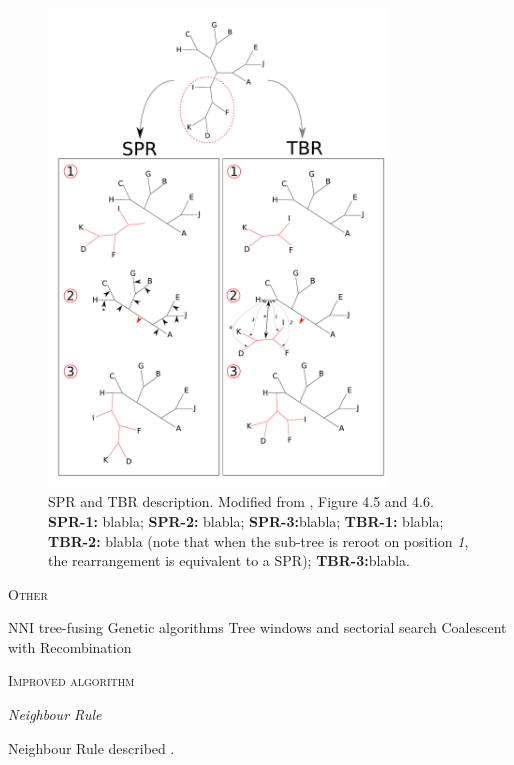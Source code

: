 \documentclass[12pt,letterpaper]{article}
\renewcommand{\section}[1]{%
\bigskip
\begin{center}
\begin{Large}
\normalfont\scshape #1
\medskip
\end{Large}
\end{center}}
\renewcommand{\subsection}[1]{%
\bigskip
\begin{center}
\begin{large}
\normalfont\itshape #1
\end{large}
\end{center}}
\begin{document}
\begin{figure}[!htbp]
\centering
   \includegraphics[width=0.8\textwidth]{Figure/FelsensteinFigure.pdf}
\caption{\scriptsize{SPR and TBR description. Modified from \cite{felsenstein2004inferring}, Figure 4.5 and 4.6. \textbf{SPR-1:} blabla; \textbf{SPR-2:} blabla; \textbf{SPR-3:}blabla; \textbf{TBR-1:} blabla; \textbf{TBR-2:} blabla (note that when the sub-tree is reroot on position \textit{1}, the rearrangement is equivalent to a SPR); \textbf{TBR-3:}blabla.}}
\label{Figure_Felsenstein}
\end{figure}


\section{Other}
NNI
tree-fusing
Genetic algorithms
Tree windows and sectorial search
Coalescent with Recombination

\section{Improved algorithm}

\subsection{Neighbour Rule}
Neighbour Rule described \citep[in other words;][]{allen2001subtree}.
\end{document}

